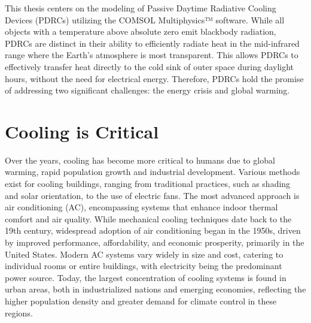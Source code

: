 


This thesis centers on the modeling of Passive Daytime Radiative Cooling Devices (PDRCs) utilizing the COMSOL Multiphysics™ software. While all objects with a temperature above absolute zero emit blackbody radiation, PDRCs are distinct in their ability to efficiently radiate heat in the mid-infrared range where the Earth's atmosphere is most transparent. This allows PDRCs to effectively transfer heat directly to the cold sink of outer space during daylight hours, without the need for electrical energy. Therefore, PDRCs hold the promise of addressing two significant challenges: the energy crisis and global warming. %

\section{Cooling is Critical}
Over the years, cooling has become more critical to humans due to global warming, rapid population growth and industrial development. Various methods exist for cooling buildings, ranging from traditional practices, such as shading and solar orientation, to the use of electric fans. The most advanced approach is air conditioning (AC), encompassing systems that enhance indoor thermal comfort and air quality. While mechanical cooling techniques date back to the 19th century, widespread adoption of air conditioning began in the 1950s, driven by improved performance, affordability, and economic prosperity, primarily in the United States. Modern AC systems vary widely in size and cost, catering to individual rooms or entire buildings, with electricity being the predominant power source. Today, the largest concentration of cooling systems is found in urban areas, both in industrialized nations and emerging economies, reflecting the higher population density and greater demand for climate control in these regions.

